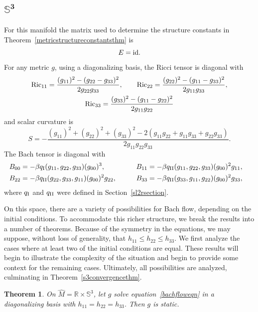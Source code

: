 \documentclass[10pt,a4paper]{amsart}
\numberwithin{equation}{section}
\newtheorem{Theorem}{Theorem}[section]
\begin{document}
\subsection[$\mathbb{S}^3$]{$\boldsymbol{\mathbb{S}^3}$}

For this manifold the matrix used to determine the structure constants in Theorem~\ref{metricstructureconstantsthm} is
\[
E = {\rm id}.
\]
For any metric $g$, using a diagonalizing basis, the Ricci tensor is diagonal with
\begin{gather*}
{\rm Ric}_{11} = \frac{(g_{11})^2 - (g_{22} - g_{33})^2}{2 g_{22} g_{33}},\qquad
{\rm Ric}_{22} = \frac{(g_{22})^2 - (g_{11} - g_{33})^2}{2 g_{11} g_{33}}, \\
{\rm Ric}_{33} = \frac{(g_{33})^2 - (g_{11} - g_{22})^2}{2 g_{11} g_{22}}
\end{gather*}
and scalar curvature is
\[
S = - \frac{(g_{11})^2 + (g_{22})^2+(g_{33})^2 - 2(g_{11} g_{22} + g_{11} g_{33} + g_{22} g_{33})}
		{2 g_{11} g_{22} g_{33}}.
\]
The Bach tensor is diagonal with{\samepage
\begin{alignat*}{3}
& B_{00}= -\beta q_{\rm I}(g_{11}, g_{22}, g_{33}) (g_{00})^3 ,\qquad &&
B_{11}= -\beta q_{\rm II}(g_{11}, g_{22}, g_{33}) (g_{00})^2 g_{11}, &\\
&B_{22}= -\beta q_{\rm II}(g_{22}, g_{33}, g_{11}) (g_{00})^2 g_{22}, \qquad &&
B_{33}= -\beta q_{\rm II}(g_{33}, g_{11}, g_{22}) (g_{00})^2 g_{33},&
\end{alignat*}
where $q_{\rm I}$ and $q_{\rm II}$ were defined in Section~\ref{sl2rsection}.}

On this space, there are a variety of possibilities for Bach flow, depending on the initial conditions. To accommodate this richer structure, we break the results into a number of theorems. Because of the symmetry in the equations, we may suppose, without loss of generality, that $h_{11} \leq h_{22} \leq h_{33}$. We first analyze the cases where at least two of the initial conditions are equal. These results will begin to illustrate the complexity of the situation and begin to provide some context for the remaining cases. Ultimately, all possibilities are analyzed, culminating in Theorem~\ref{s3convergencethm}.

\begin{Theorem} \label{s3bdythm1} On $\widehat{M} = \mathbb{R} \times \mathbb{S}^3$, let $g$ solve equation~\eqref{bachfloweqn} in a diagonalizing basis with $h_{11} = h_{22} = h_{33}$. Then $g$ is static.
\end{Theorem}
\end{document}
